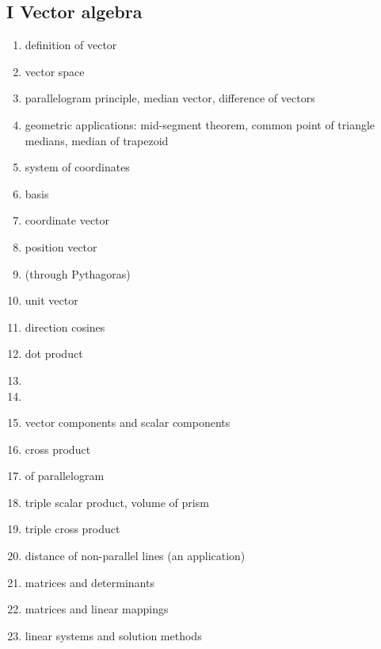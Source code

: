 \documentclass[12pt]{article}
\begin{document}
\subsection*{I Vector algebra}
\begin{enumerate}
\item definition of vector
\item vector space
\item parallelogram principle, median vector, difference of vectors
\item geometric applications: mid-segment theorem, common point of triangle medians, median of trapezoid
\item system of coordinates
\item basis
\item coordinate vector
\item position vector
\item {} (through Pythagoras)
\item unit vector
\item direction cosines
\item dot product
\item {}
\item {}
\item vector components and scalar components
\item cross product
\item {} of parallelogram 
\item triple scalar product, volume of prism
\item triple cross product
\item distance of non-parallel lines (an application)
\item matrices and determinants
\item matrices and linear mappings
\item linear systems and solution methods
\end{enumerate}
\end{document}
